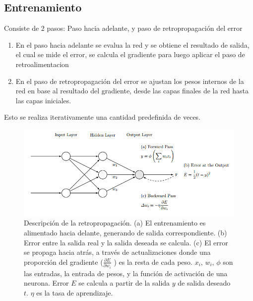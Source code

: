 \documentclass[a4paper,11pt,spanish]{book}
\begin{document}
    \subsection {Entrenamiento}
      Consiste de 2 pasos: Paso hacia adelante, y paso de retropropagación del error
      \begin{enumerate}
	\item En el paso hacia adelante se evalua la red y se obtiene el resultado de salida, el cual se mide el error, se calcula el gradiente para luego aplicar el paso de retroalimentacion
	\item En el paso de retropropagación del error se ajustan los pesos internos de la red en base al resultado del gradiente, desde las capas finales de la red hasta las capas iniciales.
      \end{enumerate}
      Esto se realiza iterativamente una cantidad predefinida de veces.
      \begin{figure}[H]
	\begin{center}
	 \includegraphics[width=\linewidth]{./img/backprop.png}
	\end{center}
	\caption{ Descripción de la retropropagación. (a) El entrenamiento es alimentado hacia delante, generando de salida correspondiente. (b) Error entre la salida real y la salida deseada
	se calcula. (c) El error se propaga hacia atrás, a través de actualizaciones donde una proporción del gradiente ($ \frac{\partial E}{\partial w_i}$ ) es la resta de cada peso. $x_i$, $w_i$, $\phi$ son las entradas,
	la entrada de pesos, y la función de activación de una neurona. Error $E$ se calcula a partir de la salida $y$ de salida deseado $t$. $\eta$ es la tasa de aprendizaje.
	\cite{Automatic_differentiation_ML} }
	\label{fig:backprop}
      \end{figure}
\end{document}
